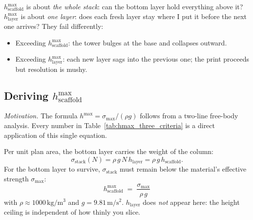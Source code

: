\documentclass[11pt,a4paper]{article}
\begin{document}
\begin{center}
\end{center}

\begin{intuitionbox}
$h_\mathrm{scaffold}^{\max}$ is about \emph{the whole stack}: can the
bottom layer hold everything above it? $h_\mathrm{layer}^{\max}$ is
about \emph{one layer}: does each fresh layer stay where I put it before
the next one arrives? They fail differently:
\begin{itemize}[leftmargin=1.4em,itemsep=1pt]
\item Exceeding $h_\mathrm{scaffold}^{\max}$: the tower bulges at the
  base and collapses outward.
\item Exceeding $h_\mathrm{layer}^{\max}$: each new layer sags into the
  previous one; the print proceeds but resolution is mushy.
\end{itemize}
\end{intuitionbox}

\subsection{Deriving $h_\mathrm{scaffold}^{\max}$}

\emph{Motivation.}
The formula $h^{\max}=\sigma_\mathrm{max}/(\rho g)$ follows from a
two-line free-body analysis.  Every number in Table~\ref{tab:hmax_three_criteria}
is a direct application of this single equation.

Per unit plan area, the bottom layer carries the weight of the column:
\begin{equation}
\sigma_\mathrm{stack}(N) = \rho\,g\,N\,h_\mathrm{layer}
                         = \rho\,g\,h_\mathrm{scaffold}.
\label{eq:sigma_stack}
\end{equation}
For the bottom layer to survive, $\sigma_\mathrm{stack}$ must remain
below the material's effective strength $\sigma_\mathrm{max}$:
\begin{equation}
\boxed{\,h_\mathrm{scaffold}^{\max}
 \;=\; \frac{\sigma_\mathrm{max}}{\rho\,g}\,}
\label{eq:hmax_master}
\end{equation}
with $\rho\approx 1000\,\si{\kg\per\m^3}$ and $g=9.81\,\si{\m/\s^2}$.
$h_\mathrm{layer}$ does \emph{not} appear here: the height ceiling is
independent of how thinly you slice.
\end{document}
